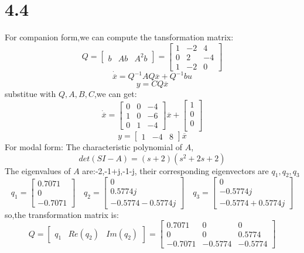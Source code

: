 \documentclass{article}
\begin{document}
\section*{4.4}
For companion form,we can compute the tansformation matrix:
\[Q=
\left[
\begin{array}{ccc}
b & Ab & A^2b
\end{array}
\right]
=
\left[
\begin{array}{ccc}
1 & -2 & 4\\
0 & 2 & -4\\
1 & -2 & 0
\end{array}
\right]
\]
\[
\dot{\overline{x}}=Q^{-1}AQ\overline{x}+Q^{-1}bu
\]
\[y=CQ\overline{x}\]
substitue with $Q,A,B,C$,we can get:
\[
\dot{\overline{x}}=
\left[
\begin{array}{ccc}
0 & 0 & -4\\
1 & 0 & -6\\
0& 1 & -4
\end{array}
\right]\overline{x}+
\left[
\begin{array}{c}
1\\
0\\
0\\
\end{array}
\right]
\]
\[y=
\left[
\begin{array}{ccc}
1 & -4 & 8
\end{array}
\right]\overline{x}
\]
For modal form:
The characteristic polynomial of $A$,
\[det(SI-A)=(s+2)(s^2+2s+2)\]
The eigenvalues of $A$ are:-2,-1+j,-1-j,
their corresponding eigenvectors are $q_1,q_2,q_3$
\[
q_1=    
\left[
\begin{array}{c}
0.7071\\
0\\
-0.7071
\end{array}
\right]
\quad
q_2=    
\left[
\begin{array}{c}
0\\
0.5774j\\
-0.5774-0.5774j
\end{array}
\right]
\quad
q_3=    
\left[
\begin{array}{c}
0\\
-0.5774j\\
-0.5774+0.5774j
\end{array}
\right]
\]
so,the transformation matrix is:
\[
Q=
\left[
\begin{array}{ccc}
q_1 & Re(q_2) &Im(q_2)
\end{array}
\right]=
\left[
\begin{array}{ccc}
0.7071 & 0 &0\\
0 &0 &0.5774\\
-0.7071 &-0.5774 & -0.5774 
\end{array}
\right]    
\]
\end{document}
